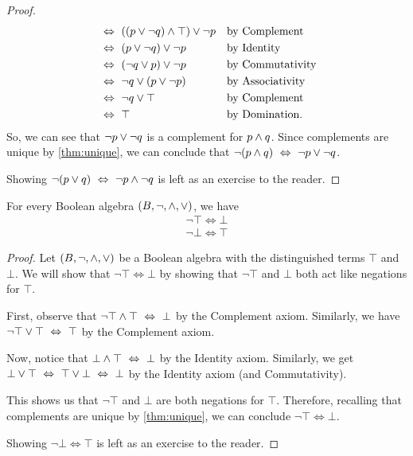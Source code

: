 \begin{proof}
\begin{alignat*}{2}
                                                &\iff \pn*{(p \join \neg q) \meet \top} \join \neg p &&\text{by Complement}\\
                                                &\iff (p \join \neg q) \join \neg p &&\text{by Identity}\\
                                                &\iff (\neg q \join p) \join \neg p &&\text{by Commutativity}\\
                                                &\iff \neg q \join (p \join \neg p) &&\text{by Associativity}\\
                                                &\iff \neg q \join \top &&\text{by Complement}\\
                                                &\iff \top &&\text{by Domination}.
    \end{alignat*}
    So, we can see that \(\neg p \vee \neg q\) is a complement for \(p \wedge q\).
    Since complements are unique by \autoref{thm:unique},
    we can conclude that \(\neg (p \wedge q) ~\Leftrightarrow~ \neg p \vee \neg q\).

    Showing \(\neg (p \vee q) ~\Leftrightarrow~ \neg p \wedge \neg q\) is left as an exercise to the reader.
\end{proof}

\begin{theorem}
    For every Boolean algebra \((B, \neg, \wedge, \vee)\), we have
    \begin{align*}
        \neg \top \iff \bot\\
        \neg \bot \iff \top
    \end{align*}
\end{theorem}
\begin{proof}
    Let \((B, \neg, \wedge, \vee)\) be a Boolean algebra with the distinguished terms \(\top\) and \(\bot\).
    We will show that \(\neg \top \iff \bot\) by showing that
    \(\neg \top\) and \(\bot\) both act like negations for \(\top\).

    First, observe that \(\neg \top \wedge \top ~\Leftrightarrow~ \bot\) by the Complement axiom.
    Similarly, we have \(\neg \top \vee \top ~\Leftrightarrow~ \top\) by the Complement axiom.

    Now, notice that \(\bot \wedge \top ~\Leftrightarrow~ \bot\) by the Identity axiom.
    Similarly, we get \(\bot \vee \top ~\Leftrightarrow~ \top \vee \bot ~\Leftrightarrow~ \bot\) by the Identity axiom
    (and Commutativity).

    This shows us that \(\neg \top\) and \(\bot\) are both negations for \(\top\).
    Therefore, recalling that complements are unique by \autoref{thm:unique},
    we can conclude \(\neg \top \iff \bot\).

    Showing \(\neg \bot \iff \top\) is left as an exercise to the reader.
\end{proof}

